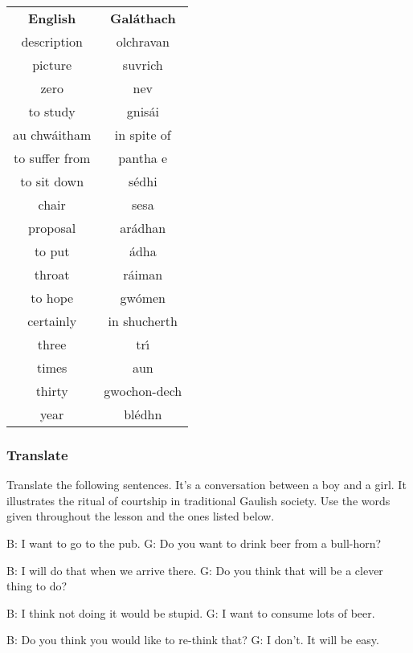 \begin{table}[H]
\centering
\begin{tabular}{cc}
  \toprule
  \textbf{English} & \textbf{Gal\'{a}thach}\\
  \cmidrule(lr){1-1}\cmidrule(lr){2-2}
  description & olchravan\\
  picture & suvrich\\
  zero & nev\\
  to study & gnis\'{a}i\\
  au chw\'{a}itham & in spite of\\
  to suffer from & pantha e\\
  to sit down & s\'{e}dhi\\
  chair & sesa\\
  proposal & ar\'{a}dhan\\
  to put & \'{a}dha\\
  throat & r\'{a}iman\\
  to hope & gw\'{o}men\\
  certainly & in shucherth\\
  three & tr\'{\i}\\
  times & aun\\
  thirty & gwochon-dech\\
  year & bl\'{e}dhn\\
  \bottomrule
\end{tabular}
\label{vocab_exercise_lesson18}
\end{table}

\subsubsection{Translate}

Translate the following sentences. It's a conversation between a boy and a girl. It illustrates the ritual of courtship in traditional Gaulish society. Use the words given throughout the lesson and the ones listed below.


B: I want to go to the pub.
G: Do you want to drink beer from a bull-horn?

B: I will do that when we arrive there.
G: Do you think that will be a clever thing to do?

B: I think not doing it would be stupid.
G: I want to consume lots of beer.

B: Do you think you would like to re-think that?
G: I don't. It will be easy.

